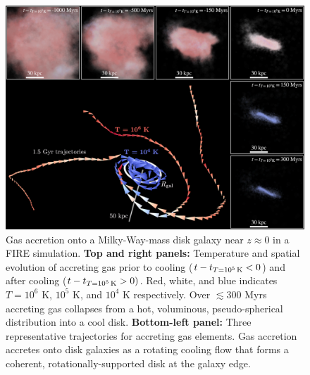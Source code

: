\documentclass[fleqn,usenatbib]{mnras}
\newcommand{\tcon}{t_{T=10^5\,{\rm K}}}
\begin{document}
\begin{figure}
    \centering
    \includegraphics[width=\textwidth]{figures/illustrative_tracks/illustrative_tracks.png}
    \caption{
Gas accretion onto a Milky-Way-mass disk galaxy near $z\approx0$ in a FIRE simulation.
\textbf{Top and right panels:}
Temperature and spatial evolution of accreting gas prior to cooling ($t-\tcon < 0$) and after cooling ($t-\tcon > 0)$.
Red, white, and blue indicates $T=10^6$ K, $10^5$ K, and $10^4$ K respectively.
Over $\lesssim 300$ Myrs accreting gas collapses from a hot, voluminous, pseudo-spherical distribution into a cool disk.
\textbf{Bottom-left panel:}
Three representative trajectories for accreting gas elements.
Gas accretion accretes onto disk galaxies as a rotating cooling flow that forms a coherent, rotationally-supported disk at the galaxy edge.
    }
    \label{f: overview}
\end{figure}
\end{document}
